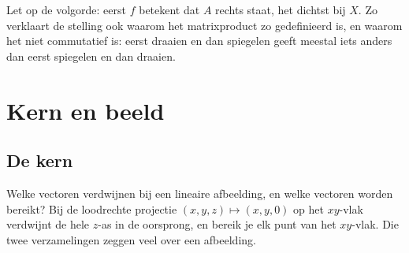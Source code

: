Let op de volgorde: eerst $f$ betekent dat $A$ rechts staat, het dichtst bij $X$. Zo verklaart de stelling ook waarom het matrixproduct zo gedefinieerd is, en waarom het niet commutatief is: eerst draaien en dan spiegelen geeft meestal iets anders dan eerst spiegelen en dan draaien.


\begin{oefeningen}
\end{oefeningen}

\section{Kern en beeld}

\subsection{De kern}

Welke vectoren verdwijnen bij een lineaire afbeelding, en welke vectoren worden bereikt? Bij de loodrechte projectie $(x, y, z) \mapsto (x, y, 0)$ op het $xy$-vlak verdwijnt de hele $z$-as in de oorsprong, en bereik je elk punt van het $xy$-vlak. Die twee verzamelingen zeggen veel over een afbeelding.

